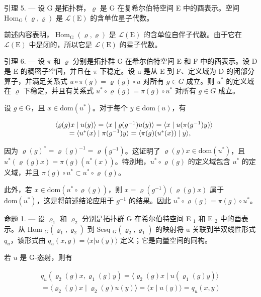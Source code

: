 引理 5. --- 设 G 是拓扑群，\(\varrho\) 是 G 在复希尔伯特空间 E 中的酉表示。空间 \(\mathrm{Hom}_{\mathrm{G}}(\varrho, \varrho)\) 是 \(\mathcal{L}(\mathrm{E})\) 的含单位星子代数。

前述内容表明，\(\operatorname{Hom}_{\mathrm{G}}(\varrho,\varrho)\) 是 \(\mathcal{L}(\mathrm{E})\) 的含单位自伴子代数。由于它在 \(\mathcal{L}(\mathrm{E})\) 中是闭的，所以它是 \(\mathcal{L}(\mathrm{E})\) 的星子代数。

引理 6. --- 设 \(\pi\) 和 \(\varrho\) 分别是拓扑群 G 在希尔伯特空间 E 和 F 中的酉表示。设 D 是 E 的稠密子空间，并且在 \(\pi\) 下稳定。设 u 是从 E 到 F、定义域为 D 的闭部分算子，并满足关系式 \(u \circ \pi(g) = \varrho(g) \circ u\) 对所有 \(g \in G\) 成立。则 \(u^{*}\) 的定义域在 \(\varrho\) 下稳定，并且有关系式 \(u^{*} \circ \varrho(g) = \pi(g) \circ u^{*}\) 对所有 \(g \in G\) 成立。

设 \(g \in \mathrm{G}\)，且 \(x \in \mathrm{dom}(u^*)\)。对于每个 \(y \in \mathrm{dom}(u)\)，有

\[
\begin{array}{r l} & {\langle \varrho (g) x \mid u (y) \rangle = \langle x \mid \varrho (g ^ {- 1}) u (y) \rangle = \langle x \mid u (\pi (g ^ {- 1}) y) \rangle} \\ & {\qquad = \langle u ^ {*} (x) \mid \pi (g ^ {- 1}) y \rangle = \langle \pi (g) (u ^ {*} (x)) \mid y \rangle ,} \end{array}
\]

因为 \(\varrho(g)^{*} = \varrho(g)^{-1} = \varrho(g^{-1})\)。这证明了 \(\varrho(g)x \in \mathrm{dom}(u^{*})\)，且 \(u^{*}(\varrho(g)x) = \pi(g)(u^{*}(x))\)。特别地，\(u^{*} \circ \varrho(g)\) 的定义域包含 \(u^{*}\) 的定义域，并且 \(\pi(g) \circ u^{*} \subset u^{*} \circ \varrho(g)\)。

此外，若 \(x \in \text{dom}(u^{*} \circ \varrho(g))\)，则 \(x = \varrho(g^{-1})(\varrho(g)x)\) 属于 \(\text{dom}(u^{*})\)，这是将前述结论应用于 \(g^{-1}\) 的结果。因此 \(u^{*} \circ \varrho(g) = \pi(g) \circ u^{*}\)。

命题 1. --- 设 \(\varrho_{1}\) 和 \(\varrho_{2}\) 分别是拓扑群 G 在希尔伯特空间 E \(_{1}\) 和 E \(_{2}\) 中的酉表示。从 Hom \(_{G}(\varrho_{1},\varrho_{2})\) 到 Sesq \(_{G}(\varrho_{2},\varrho_{1})\) 的映射将 u 关联到半双线性形式 \(q_{u}\)，该形式由 \(q_{u}(x,y)=\langle x|u(y)\rangle\) 定义；它是向量空间的同构。

若 \(u\) 是 G-态射，则有

\[
\begin{array}{c} q _ {u} (\varrho_ {2} (g) x, \varrho_ {1} (g) y) = \langle \varrho_ {2} (g) x \mid u (\varrho_ {1} (g)y) \rangle \\ = \langle \varrho_ {2} (g) x \mid \varrho_ {2} (g) u (y) \rangle = \langle x \mid u (y) \rangle = q _ {u} (x, y) \end{array}
\]

